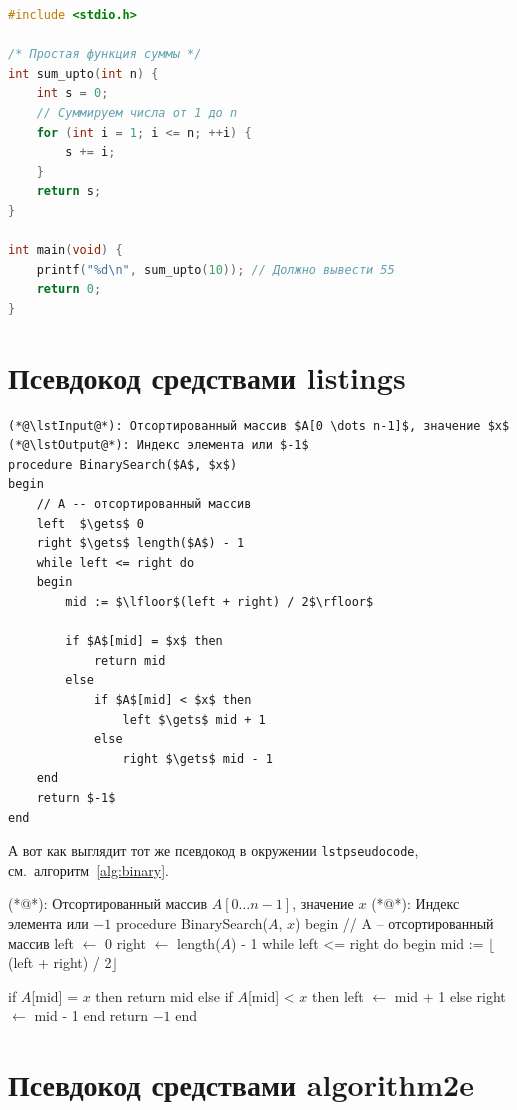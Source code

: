 \documentclass[12pt]{extreport}
\begin{document}
\begin{lstlisting}[language=C,caption={Тест C-кода с русскими комментариями}]
#include <stdio.h>

/* Простая функция суммы */
int sum_upto(int n) {
    int s = 0;
    // Суммируем числа от 1 до n
    for (int i = 1; i <= n; ++i) {
        s += i;
    }
    return s;
}

int main(void) {
    printf("%d\n", sum_upto(10)); // Должно вывести 55
    return 0;
}
\end{lstlisting}
\section{Псевдокод средствами listings}
\label{sec:orgaf4cf3b}

\begin{lstlisting}[style=pseudocode,caption={Псевдокод через listings}]
(*@\lstInput@*): Отсортированный массив $A[0 \dots n-1]$, значение $x$
(*@\lstOutput@*): Индекс элемента или $-1$
procedure BinarySearch($A$, $x$)
begin
    // A -- отсортированный массив
    left  $\gets$ 0
    right $\gets$ length($A$) - 1
    while left <= right do
    begin
        mid := $\lfloor$(left + right) / 2$\rfloor$

        if $A$[mid] = $x$ then
            return mid
        else
            if $A$[mid] < $x$ then
                left $\gets$ mid + 1
            else
                right $\gets$ mid - 1
    end
    return $-1$
end
\end{lstlisting}

А вот как выглядит тот же псевдокод в окружении \texttt{lstpseudocode}, см.~алгоритм~\ref{alg:binary}.

\begin{lstpseudocode}[caption={Псевдокод через LSTpseudocode}, label={alg:binary}]
(*@\lstInput@*): Отсортированный массив $A[0 \dots n-1]$, значение $x$
(*@\lstOutput@*): Индекс элемента или $-1$
procedure BinarySearch($A$, $x$)
begin
    // A -- отсортированный массив
    left  $\gets$ 0
    right $\gets$ length($A$) - 1
    while left <= right do
    begin
        mid := $\lfloor$(left + right) / 2$\rfloor$

        if $A$[mid] = $x$ then
            return mid
        else
            if $A$[mid] < $x$ then
                left $\gets$ mid + 1
            else
                right $\gets$ mid - 1
    end
    return $-1$
end
\end{lstpseudocode}
\section{Псевдокод средствами algorithm2e}
\label{sec:orgd5299af}
\end{document}
